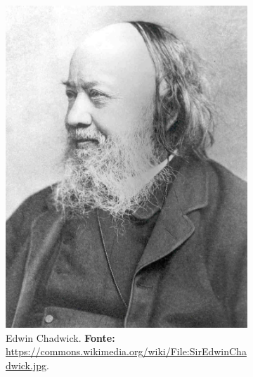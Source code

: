 \begin{figure}[!htp]
\begin{footnotesize}
	\begin{subfigure}[b]{0.4\linewidth}
		\centering
		\includegraphics[width=1\textwidth]{2-cap1/complementos/fotos/SirEdwinChadwick.jpg} 
		\caption{Edwin Chadwick. \textbf{Fonte:} \url{https://commons.wikimedia.org/wiki/File:SirEdwinChadwick.jpg}.}
		\label{fig:edwinchadwick}
	\end{subfigure}	
	\
	\begin{subfigure}[b]{0.4\linewidth}
		\centering

\end{subfigure}
\end{footnotesize}
\end{figure}
